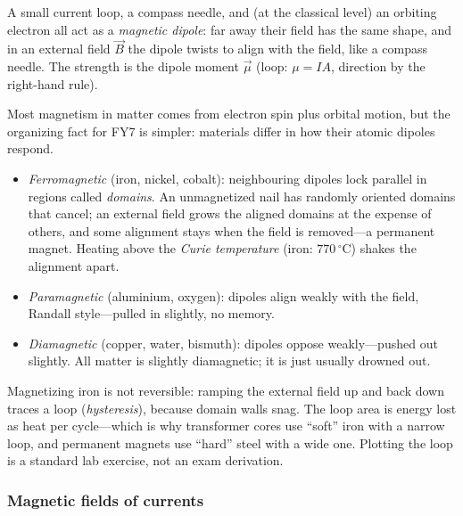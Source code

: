 \begin{definition}\label{def:dipole}
A small current loop, a compass needle, and (at the classical level) an orbiting electron all act as a \emph{magnetic dipole}: far away their field has the same shape, and in an external field $\vec{B}$ the dipole twists to align with the field, like a compass needle. The strength is the dipole moment $\vec{\mu}$ (loop: $\mu = IA$, direction by the right-hand rule).
\end{definition}

Most magnetism in matter comes from electron spin plus orbital motion, but the organizing fact for FY7 is simpler: materials differ in how their atomic dipoles respond.

\begin{itemize}
  \item \emph{Ferromagnetic} (iron, nickel, cobalt): neighbouring dipoles lock parallel in regions called \emph{domains}. An unmagnetized nail has randomly oriented domains that cancel; an external field grows the aligned domains at the expense of others, and some alignment stays when the field is removed---a permanent magnet. Heating above the \emph{Curie temperature} (iron: $770\,^\circ\mathrm{C}$) shakes the alignment apart.
  \item \emph{Paramagnetic} (aluminium, oxygen): dipoles align weakly with the field, Randall style---pulled in slightly, no memory.
  \item \emph{Diamagnetic} (copper, water, bismuth): dipoles oppose weakly---pushed out slightly. All matter is slightly diamagnetic; it is just usually drowned out.
\end{itemize}

\begin{remark}\label{rmk:hysteresis}
Magnetizing iron is not reversible: ramping the external field up and back down traces a loop (\emph{hysteresis}), because domain walls snag. The loop area is energy lost as heat per cycle---which is why transformer cores use ``soft'' iron with a narrow loop, and permanent magnets use ``hard'' steel with a wide one. Plotting the loop is a standard lab exercise, not an exam derivation.
\end{remark}

\subsubsection{Magnetic fields of currents}

